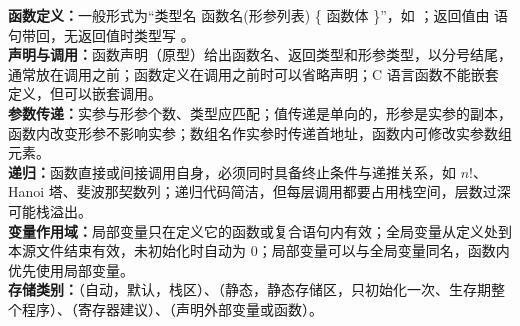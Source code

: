 \documentclass[a4paper,11pt]{article}
\begin{document}

\begin{knowmap}
\textbf{函数定义：}一般形式为“类型名 函数名(形参列表) \{ 函数体 \}”，如 ；返回值由  语句带回，无返回值时类型写 。\\[2pt]
\textbf{声明与调用：}函数声明（原型）给出函数名、返回类型和形参类型，以分号结尾，通常放在调用之前；函数定义在调用之前时可以省略声明；C 语言函数不能嵌套定义，但可以嵌套调用。\\[2pt]
\textbf{参数传递：}实参与形参个数、类型应匹配；值传递是单向的，形参是实参的副本，函数内改变形参不影响实参；数组名作实参时传递首地址，函数内可修改实参数组元素。\\[2pt]
\textbf{递归：}函数直接或间接调用自身，必须同时具备终止条件与递推关系，如 $n!$、Hanoi 塔、斐波那契数列；递归代码简洁，但每层调用都要占用栈空间，层数过深可能栈溢出。\\[2pt]
\textbf{变量作用域：}局部变量只在定义它的函数或复合语句内有效；全局变量从定义处到本源文件结束有效，未初始化时自动为 0；局部变量可以与全局变量同名，函数内优先使用局部变量。\\[2pt]
\textbf{存储类别：}（自动，默认，栈区）、（静态，静态存储区，只初始化一次、生存期整个程序）、（寄存器建议）、（声明外部变量或函数）。
\end{knowmap}
\end{document}
